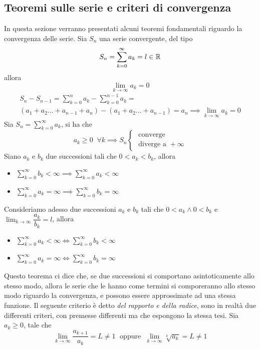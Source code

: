 \documentclass[10pt, letterpaper]{report}
\begin{document}
\subsection{Teoremi sulle serie e criteri di convergenza}
In questa sezione verranno presentati alcuni teoremi fondamentali riguardo la convergenza 
delle serie. \acc 
{} Sia $S_n$ una serie convergente, del tipo 
$$ S_n=  \sum_{k=0}^\infty a_k = l\in {\mathbb R}$$
allora $$\lim_{k\rightarrow\infty}a_k=0$$
\dimo{} 
$$\begin{matrix} 
    S_n-S_{n-1}= \sum_{k=0}^n a_k-\sum_{k=0}^{n-1} a_k =  \\
    (a_1+a_2\dots+ a_{n-1}+a_n)-(a_1+a_2\dots+ a_{n-1})=
    a_n \implies \lim_{k\rightarrow\infty}a_k=0
\end{matrix} $$
Sia $S_n=  \sum_{k=0}^\infty a_k$, si ha che 
$$ a_k\ge 0 \;\;\forall k\implies S_n \begin{cases}
   \text{ converge}\\
    \text{ diverge a }+\infty
\end{cases}$$
 Siano $a_k$ e $b_k$ due successioni tali che $0<a_k<b_k$, allora\begin{itemize}
    \item $ \sum_{k=0}^\infty b_k<\infty \implies \sum_{k=0}^\infty a_k<\infty$
    \item $ \sum_{k=0}^\infty a_k=\infty \implies \sum_{k=0}^\infty b_k=\infty$
\end{itemize}
Consideriamo adesso due successioni  $a_k$ e $b_k$ tali che $0<a_k \land 0<b_k$ e 
$\displaystyle \lim_{k\rightarrow \infty}\dfrac{a_k}{b_k}=l$, allora \begin{itemize}
    \item $ \sum_{k=0}^\infty a_k<\infty \iff \sum_{k=0}^\infty b_k<\infty$
    \item $ \sum_{k=0}^\infty a_k=\infty \iff \sum_{k=0}^\infty b_k=\infty$
\end{itemize}
Questo teorema ci dice che, se due successioni si comportano asintoticamente allo stesso modo, 
allora le serie che le hanno come termini si comporeranno allo stesso modo riguardo 
la convergenza, e possono essere approssimate ad una stessa funzione.\acc 
Il seguente criterio è detto \textit{del rapporto e della radice}, sono in realtà 
due differenti criteri, con premesse differenti ma che espongono la stessa tesi. Sia 
$a_k\ge 0$, tale che 
$$ \lim_{k\rightarrow \infty} \dfrac{a_{k+1}}{a_k}= L\ne 1 \;\text{ oppure }\;
\lim_{k\rightarrow \infty} \sqrt[k]{a_k}= L\ne 1$$ 
\end{document}
